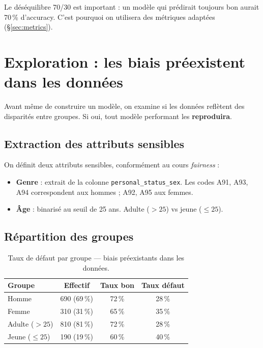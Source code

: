 \documentclass[11pt, a4paper]{article}
\begin{document}
Le d\'{e}s\'{e}quilibre 70/30 est important : un mod\`{e}le qui pr\'{e}dirait toujours \og bon \fg{} aurait 70\,\% d'accuracy. C'est pourquoi on utilisera des m\'{e}triques adapt\'{e}es (\S\ref{sec:metrics}).

\section{Exploration : les biais pr\'{e}existent dans les donn\'{e}es}
\label{sec:explore}

\begin{questionbox}
Avant m\^{e}me de construire un mod\`{e}le, on examine si les donn\'{e}es refl\`{e}tent des disparit\'{e}s entre groupes. Si oui, tout mod\`{e}le performant les \textbf{reproduira}.
\end{questionbox}

\subsection{Extraction des attributs sensibles}

On d\'{e}finit deux attributs sensibles, conform\'{e}ment au cours \emph{fairness} :

\begin{itemize}
    \item \textbf{Genre} : extrait de la colonne \texttt{personal\_status\_sex}. Les codes A91, A93, A94 correspondent aux hommes ; A92, A95 aux femmes.
    \item \textbf{\^{A}ge} : binaris\'{e} au seuil de 25 ans. Adulte ($> 25$) vs jeune ($\leq 25$).
\end{itemize}

\subsection{R\'{e}partition des groupes}

\begin{table}[H]
\centering
\begin{tabular}{lccc}
\toprule
\textbf{Groupe} & \textbf{Effectif} & \textbf{Taux bon} & \textbf{Taux d\'{e}faut} \\
\midrule
\rowcolor{accent!6} Homme & 690 (69\,\%) & 72\,\% & 28\,\% \\
\rowcolor{accent!6} Femme & 310 (31\,\%) & 65\,\% & 35\,\% \\
\midrule
\rowcolor{fair!6} Adulte ($>25$) & 810 (81\,\%) & 72\,\% & 28\,\% \\
\rowcolor{fair!6} Jeune ($\leq 25$) & 190 (19\,\%) & 60\,\% & 40\,\% \\
\bottomrule
\end{tabular}
\caption{Taux de d\'{e}faut par groupe --- biais pr\'{e}existants dans les donn\'{e}es.}
\label{tab:bias}
\end{table}
\end{document}
